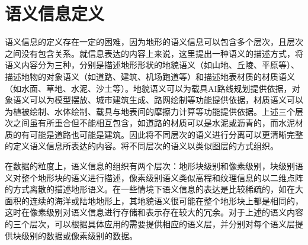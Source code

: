\section{语义信息定义}
语义信息的定义存在一定的困难，因为地形的语义信息可以包含多个层次，且层次之间没有包含关系。就信息表达的内容上来说，这里提出一种语义的描述方式，将语义内容分为三种，分别是描述地形形状的地貌语义（如山地、丘陵、平原等）、描述地物的对象语义（如道路、建筑、机场跑道等）和描述地表材质的材质语义（如水面、草地、水泥、沙土等）。地貌语义可以为载具AI路线规划提供依据，对象语义可以为模型摆放、城市建筑生成、路网绘制等功能提供依据，材质语义可以为植被绘制、水体绘制、载具与地表间的摩擦力计算等功能提供依据。上述三个层次之间虽有所重合但不能相互包含，如道路的材质可以是水泥或沥青的，而水泥材质的有可能是道路也可能是建筑。因此将不同层次的语义进行分离可以更清晰完整的定义语义信息所表达的内容。将不同层次的语义以类似图层的方式组织。\par
在数据的粒度上，语义信息的组织有两个层次：地形块级别和像素级别，块级别语义对整个地形块的语义进行描述，像素级别语义类似高程和纹理信息的以二维点阵的方式离散的描述地形语义。在一些情境下语义信息的表达是比较稀疏的，如在大面积的连续的海洋或陆地地形上，其地貌语义很可能在整个地形块上都是相同的，这时在像素级别对语义信息进行存储和表示存在较大的冗余。对于上述的语义内容的三个层次，可以根据具体应用的需要提供相应的语义层，并分别对每个语义层提供块级别的数据或像素级别的数据。\par
